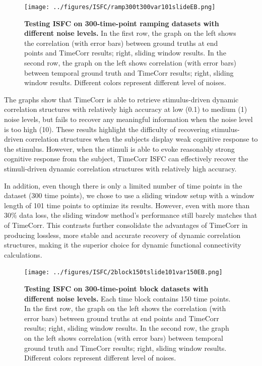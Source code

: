 \documentclass[11pt]{article}
\begin{document}
\begin{figure}[!htb]
\texttt{[image: ../figures/ISFC/ramp300t300var101slideEB.png]}
\caption{\textbf{Testing ISFC on 300-time-point ramping datasets with different noise levels.} In the first row, the graph on the left shows the correlation (with error bars) between ground truths at end points and TimeCorr results; right, sliding window results. In the second row, the graph on the left shows correlation (with error bars) between temporal ground truth and TimeCorr results; right, sliding window results. Different colors represent different level of noises.}
\label{fig:t300slide25var1000}
\end{figure}

The graphs show that TimeCorr is able to retrieve stimulus-driven dynamic correlation structures with relatively high accuracy at low (0.1) to medium (1) noise levels, but fails to recover any meaningful information when the noise level is too high (10). These results highlight the difficulty of recovering stimulus-driven correlation structures when the subjects display weak cognitive response to the stimulus. However, when the stimuli is able to evoke reasonably strong cognitive response from the subject, TimeCorr ISFC can effectively recover the stimuli-driven dynamic correlation structures with relatively high accuracy.

In addition, even though there is only a limited number of time points in the dataset (300 time points), we chose to use a sliding window setup with a window length of 101 time points to optimize its results. However, even with more than $30\%$ data loss, the sliding window method's performance still barely matches that of TimeCorr. This contrasts further consolidate the advantages of TimeCorr in producing lossless, more stable and accurate recovery of dynamic correlation structures, making it the superior choice for dynamic functional connectivity calculations.

\begin{figure}
\texttt{[image: ../figures/ISFC/2block150tslide101var150EB.png]}
\caption{\textbf{Testing ISFC on 300-time-point block datasets with different noise levels.} Each time block contains 150 time points. In the first row, the graph on the left shows the correlation (with error bars) between ground truths at end points and TimeCorr results; right, sliding window results. In the second row, the graph on the left shows correlation (with error bars) between temporal ground truth and TimeCorr results; right, sliding window results. Different colors represent different level of noises.}
\label{fig:2block150tslide101var150EB}
\end{figure}
\end{document}
